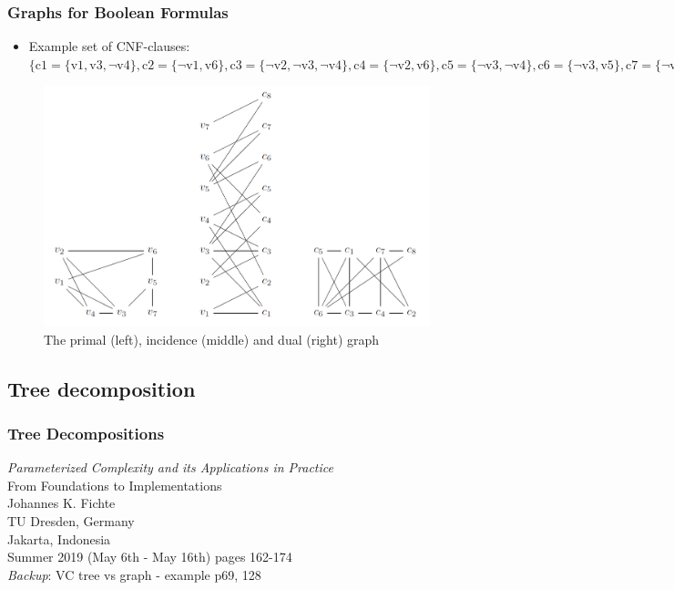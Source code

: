 \documentclass[c,8pt,xcolor...,x11names]{beamer}
\begin{document}
\begin{frame}
	\frametitle{Graphs for Boolean Formulas}
	\smallskip
	\begin{itemize}
		\item {\color{blue} Example set of CNF-clauses:}\smallskip\\
		      {\tiny $\{\text{c1}=\{\text{v1},\text{v3},\neg \text{v4}\},\text{c2}=\{\neg \text{v1},\text{v6}\},\text{c3}=\{\neg \text{v2},\neg \text{v3},\neg \text{v4}\},\text{c4}=\{\neg \text{v2},\text{v6}\},\text{c5}=\{\neg \text{v3},\neg \text{v4}\},\text{c6}=\{\neg \text{v3},\text{v5}\},\text{c7}=\{\neg \text{v5},\neg \text{v6}\},\text{c8}=\{\text{v5},\text{v7}\}\}
		      $
		      }
	\end{itemize}
	\begin{figure}
		\includegraphics[height=0.5\textheight]{images/DAGraphs.png}
		\caption{The primal (left), incidence (middle) and dual (right) graph}
	\end{figure}

\end{frame}

\subsection[TD]{Tree decomposition}
\begin{frame}
	\frametitle{Tree Decompositions}
	{\color{blue}\emph{Parameterized Complexity and its Applications in Practice} \\
	From Foundations to Implementations \\
	Johannes K. Fichte \\
	TU Dresden, Germany \\
	Jakarta, Indonesia \\
	{Summer 2019 (May 6th - May 16th)}
	}
	pages 162-174\\
	\bigskip
	\emph{Backup}: VC tree vs graph - example p69, 128
\end{frame}
%	
\end{document}

